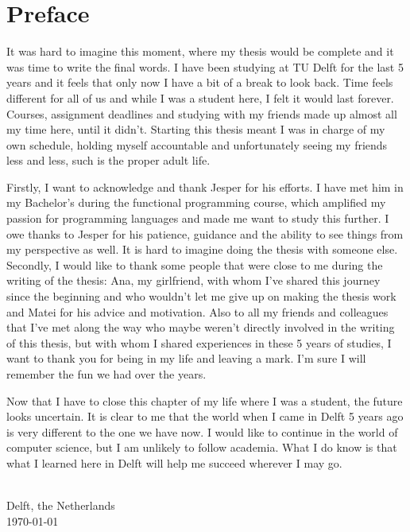 
\chapter{\label{chap:Preface}Preface}

It was hard to imagine this moment, where my thesis would be complete and it was time to write the final words. I have been studying at TU Delft for the last 5 years and it feels that only now I have a bit of a break to look back. Time feels different for all of us and while I was a student here, I felt it would last forever. Courses, assignment deadlines and studying with my friends made up almost all my time here, until it didn't. Starting this thesis meant I was in charge of my own schedule, holding myself accountable and unfortunately seeing my friends less and less, such is the proper adult life.

Firstly, I want to acknowledge and thank Jesper for his efforts. I have met him in my Bachelor's during the functional programming course, which amplified my passion for programming languages and made me want to study this further. I owe thanks to Jesper for his patience, guidance and the ability to see things from my perspective as well. It is hard to imagine doing the thesis with someone else.
Secondly, I would like to thank some people that were close to me during the writing of the thesis: Ana, my girlfriend, with whom I've shared this journey since the beginning and who wouldn't let me give up on making the thesis work and Matei for his advice and motivation. Also to all my friends and colleagues that I've met along the way who maybe weren't directly involved in the writing of this thesis, but with whom I shared experiences in these 5 years of studies, I want to thank you for being in my life and leaving a mark. I'm sure I will remember the fun we had over the years.

Now that I have to close this chapter of my life where I was a student, the future looks uncertain. It is clear to me that the world when I came in Delft 5 years ago is very different to the one we have now. I would like to continue in the world of computer science, but I am unlikely to follow academia. What I do know is that what I learned here in Delft will help me succeed wherever I may go.


\vspace{1cm}
\begin{flushright}
\theauthor{}\\
Delft, the Netherlands\\
\today{}\\
\end{flushright}
